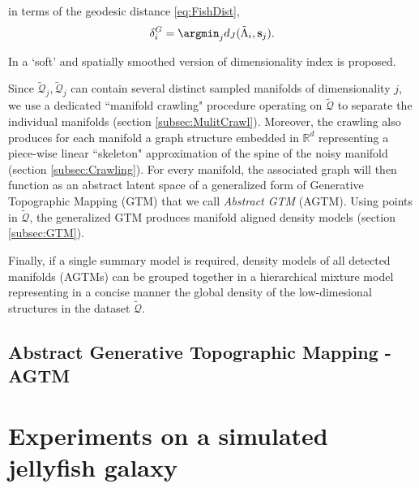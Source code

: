 in terms of the geodesic distance
\eqref{eq:FishDist},
\begin{equation}\label{eq:idxHard}
	\delta^G_i = \argmin_j d_J(\tilde{\Lambda}_i,\vect{s}_j).
\end{equation} 

In \citet{Canducci2021} a `soft' and spatially smoothed version of dimensionality index is proposed.



Since $\tilde{\mathcal{Q}}_j, \tilde{\mathcal{Q}}_j$ can contain several distinct sampled manifolds of dimensionality $j$, we use a dedicated ``manifold crawling" procedure operating on $\tilde{\mathcal{Q}}$ to separate the individual manifolds
(section \ref{subsec:MulitCrawl}).
Moreover, the crawling also produces for each manifold a graph structure embedded in $\mathbb{R}^d$ representing a piece-wise linear ``skeleton" approximation of the spine of the noisy manifold (section \ref{subsec:Crawling}).
For every manifold, the associated graph will then function as an abstract latent space of a generalized form of Generative Topographic Mapping (GTM) \cite{Bishop1998GTMTG} that we call \textit{Abstract GTM} (AGTM).
Using points in $\tilde{\mathcal{Q}}$, the generalized GTM produces manifold aligned density models (section \ref{subsec:GTM}).

Finally, if a single summary model is required, density models of all detected manifolds (AGTMs) can be grouped together in a hierarchical mixture model \cite{Tino_PAMI_2002} representing in a concise manner the global density of the low-dimesional structures in the dataset $\tilde{\mathcal{Q}}$.

\subsection{Abstract Generative Topographic Mapping - AGTM}



\section{Experiments on a simulated jellyfish galaxy}\label{sec:Ex_JellyFish}

